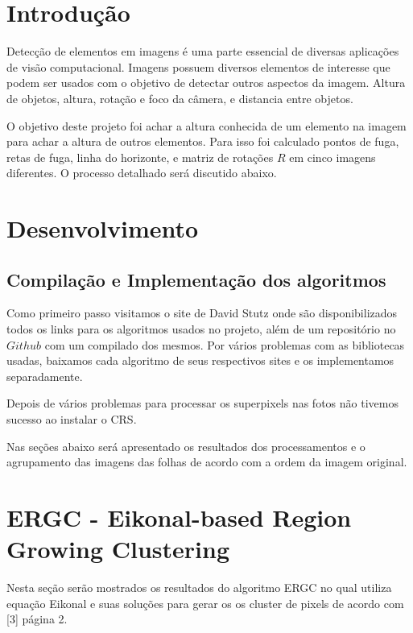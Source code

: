 \documentclass[a4paper, 12pt]{article}
\begin{document}
	\section*{Introdução}

    Detecção de elementos em imagens é uma parte essencial de diversas aplicações de visão computacional. Imagens possuem diversos elementos de interesse que podem ser usados com o objetivo de detectar outros aspectos da imagem. Altura de objetos, altura, rotação e foco da câmera, e distancia entre objetos.

    O objetivo deste projeto foi achar a altura conhecida de um elemento na imagem para achar a altura de outros elementos. Para isso foi calculado pontos de fuga, retas de fuga, linha do horizonte, e matriz de rotações $R$ em cinco imagens diferentes. O processo detalhado será discutido abaixo.

    \section*{Desenvolvimento}
		\subsection*{Compilação e Implementação dos algoritmos}
        Como primeiro passo visitamos o site de David Stutz onde são disponibilizados todos os links para os algoritmos
        usados no projeto, além de um repositório no $Github$ com um compilado dos mesmos.
        Por vários problemas com as bibliotecas usadas, baixamos cada algoritmo de seus respectivos
        sites e os implementamos separadamente. \par

        Depois de vários problemas para processar os superpixels nas fotos não tivemos sucesso
        ao instalar o CRS. \par

        Nas seções abaixo será apresentado os resultados dos processamentos e o agrupamento das
        imagens das folhas de acordo com a ordem da imagem original.


    \section*{ERGC - Eikonal-based Region Growing Clustering}
    Nesta seção serão mostrados os resultados do algoritmo ERGC no qual utiliza
    equação Eikonal e suas soluções para gerar os os cluster de pixels de acordo
    com [3] página 2.
\end{document}
